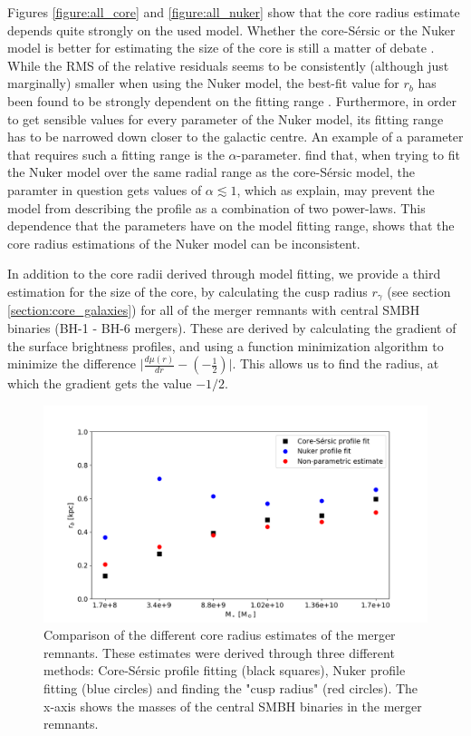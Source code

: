 \documentclass[english, twoside]{HYgradu}
\begin{document}
Figures \ref{figure:all_core} and \ref{figure:all_nuker} show that the core radius estimate depends quite strongly on the used model. Whether the core-Sérsic or the Nuker model is better for estimating the size of the core is still a matter of debate \citep{Lauer2007, Dullo2012}. While the RMS of the relative residuals seems to be consistently (although just marginally) smaller when using the Nuker model, the best-fit value for $r_b$ has been found to be strongly dependent on the fitting range \citep{Graham2003}. Furthermore, in order to get sensible values for every parameter of the Nuker model, its fitting range has to be narrowed down closer to the galactic centre. An example of a parameter that requires such a fitting range is the $\alpha$-parameter. \cite{Rantala2018} find that, when trying to fit the Nuker model over the same radial range as the core-Sérsic model, the paramter in question gets values of $\alpha \lesssim 1$, which as \cite{Graham2003} explain, may prevent the model from describing the profile as a combination of two power-laws. This dependence that the parameters have on the model fitting range, shows that the core radius estimations of the Nuker model can be inconsistent.

In addition to the core radii derived through model fitting, we provide a third estimation for the size of the core, by calculating the cusp radius $r_\gamma$ (see section \ref{section:core_galaxies}) for all of the merger remnants with central SMBH binaries (BH-1 - BH-6 mergers). These are derived by calculating the gradient of the surface brightness profiles, and using a function minimization algorithm \citep{NelderMead} to minimize the difference $\big| \frac{d\mu(r)}{dr} - \left( - \frac{1}{2} \right) \big|$. This allows us to find the radius, at which the gradient gets the value $-1/2$. 

\begin{figure}
	\centering
	\includegraphics[width=\textwidth]{rb_mass_relation.png}
	\caption{Comparison of the different core radius estimates of the merger remnants. These estimates were derived through three different methods: Core-Sérsic profile fitting (black squares), Nuker profile fitting (blue circles) and  finding the "cusp radius" (red circles). The x-axis shows the masses of the central SMBH binaries in the merger remnants.}
	\label{figure:radii_comparison}
\end{figure}
\end{document}
